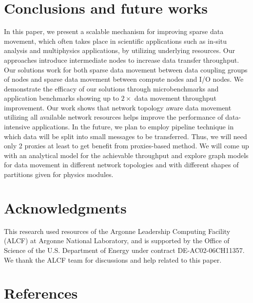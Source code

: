 \documentclass[final,5p,times]{elsarticle}
\begin{document}
\section{Conclusions and future works}
\label{sec:conclusions}

In this paper, we present a scalable mechanism for improving sparse data movement, which often takes place in scientific applications such as  in-situ analysis and multiphysics applications, by utilizing underlying resources. Our approaches introduce intermediate nodes to increase data transfer throughput. Our solutions work for both sparse data movement between data coupling groups of nodes and sparse data movement between compute nodes and I/O nodes. We demonstrate the efficacy of our solutions through microbenchmarks and application benchmarks showing up to $2\times$ data movement throughput improvement. Our work shows that network topology aware data movement utilizing all available network resources helps improve the performance of data-intensive applications.
In the future, we plan to employ pipeline technique in which data will be split into small messages to be transferred. Thus, we will need only 2 proxies at least to get benefit from proxies-based method. We will come up with an analytical model for the achievable throughput and explore graph models for data movement in different network topologies and with different shapes of partitions given for physics modules.

\section*{Acknowledgments}

This research used resources of the Argonne Leadership Computing Facility (ALCF) at Argonne National Laboratory, and is supported by the Office of Science of the U.S. Department of Energy under contract DE-AC02-06CH11357. We thank the ALCF team for discussions and help related to this paper.



\section*{References}

 






\end{document}
